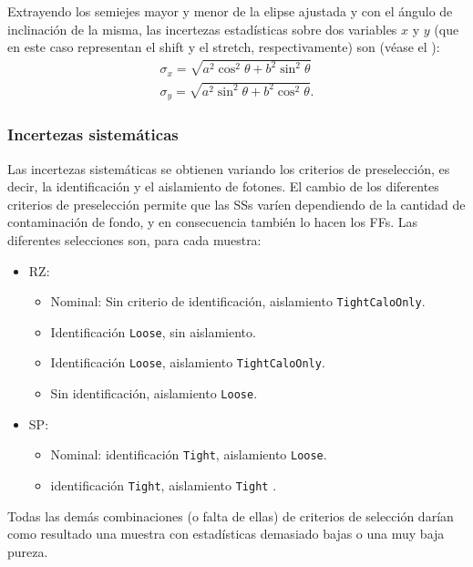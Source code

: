 Extrayendo los semiejes mayor y menor de la elipse ajustada y con el ángulo de inclinación de la misma, las incertezas estadísticas sobre dos variables \(x\) y \(y\) (que en este caso representan el shift y el stretch, respectivamente) son (véase el \App{\ref{app:ellipse_formulae}}):
\begin{gather}
    \sigma_x = \sqrt{a^2 \cos^2\theta + b^2 \sin^2\theta}\\
    \sigma_y = \sqrt{a^2 \sin^2\theta + b^2 \cos^2\theta}.
\end{gather}

\subsubsection{Incertezas sistem\'aticas}

Las incertezas sistemáticas se obtienen variando los criterios de preselección, es decir, la identificación y el aislamiento de fotones. El cambio de los diferentes criterios de preselección permite que las \acp{SS} varíen dependiendo de la cantidad de contaminación de fondo, y en consecuencia también lo hacen los \acp{FF}.
Las diferentes selecciones son, para cada muestra:
\begin{itemize}
    \item \acf{RZ}:
        \begin{itemize}
            \item Nominal: Sin criterio de identificaci\'on, aislamiento \texttt{TightCaloOnly}.
            \item Identificación \texttt{Loose}, sin aislamiento.
            \item Identificación \texttt{Loose}, aislamiento \texttt{TightCaloOnly}.
            \item Sin identificación, aislamiento \texttt{Loose}.
        \end{itemize}
    \item \acf{SP}:
        \begin{itemize}
            \item Nominal: identificaci\'on \texttt{Tight}, aislamiento \texttt{Loose}.
            \item identificaci\'on \texttt{Tight}, aislamiento \texttt{Tight} .
        \end{itemize}
\end{itemize}
Todas las demás combinaciones (o falta de ellas) de criterios de selección darían como resultado una muestra con estadísticas demasiado bajas o una muy baja pureza.

